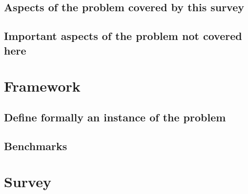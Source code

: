 \documentclass[a4paper,11pt]{article}
\begin{document}
\subsection{Aspects of the problem covered by this survey}

\subsection{Important aspects of the problem not covered here}

\section{Framework}

\subsection{Define formally an instance of the problem}

\subsection{Benchmarks}

\section{Survey}
\end{document}
